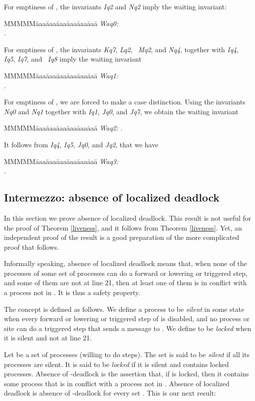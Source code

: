 \documentclass[10pt]{article} \usepackage[english]{babel}
\newenvironment{tab}{\begin{tabbing}
MMMMM\=aaa\=aaa\=aaa\=aaa\=aaa\=aaa\= \kill}{\end{tabbing}}
\def\S #1/{\mbox {\textsl{#1}}}
\begin{document}
For emptiness of , the invariants \S Iq2/ and \S Nq2/
imply the {waiting invariant}:
\begin{tab}
\S Waq0:/ \> \\
\>  .
\end{tab}

For emptiness of , the invariants \S Kq7/, \S Lq2/, \S
Mq2/, and \S Nq4/, together with \S Iq4/, \S Iq5/, \S Iq7/, and \S
Iq8/ imply the waiting invariant
\begin{tab}
\S Waq1:/ \>  \\
\>  .
\end{tab}

For emptiness of , we are forced to make a case
distinction.  Using the invariants \S Nq0/ and \S Nq1/ together with
\S Iq1/, \S Jq0/, and \S Jq7/, we obtain the waiting invariant
\begin{tab}
\S Waq2:/ \>  .
\end{tab}

It follows from \S Iq4/, \S Iq5/, \S Jq0/, and \S Jq2/, that we have
\begin{tab}
\S Waq3:/ \>  \\
\>  .
\end{tab}

\subsection{Intermezzo: absence of localized deadlock} \label{nolocdead}

In this section we prove absence of localized deadlock.  This result
is not useful for the proof of Theorem \ref{liveness}, and it follows
from Theorem \ref{liveness}.  Yet, an independent proof of the result
is a good preparation of the more complicated proof that follows.

Informally speaking, absence of localized deadlock means that, when
none of the processes of some set  of processes can do a forward or
lowering or triggered step, and some of them are not at line 21, then
at least one of them is in conflict with a process not in . It is
thus a safety property.

The concept is defined as follows. We define a process  to be
\emph{silent} in some state when every forward or lowering or
triggered step of  is disabled, and no process or site can do a
triggered step that sends a message to .  We define  to be
\emph{locked} when it is silent and not at line 21.

Let  be a set of processes (willing to do steps).  The set  is
said to be \emph{silent} if all its processes are silent.  It is said
to be \emph{locked} if it is silent and contains locked processes.
Absence of -deadlock is the assertion that, if  is locked, then
it contains some process that is in conflict with a process not in
.  Absence of localized deadlock is absence of -deadlock for
every set .  This is our next result:
\end{document}
